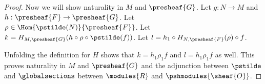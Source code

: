 \begin{proof}
Now we will show naturality in $M$ and $\presheaf{G}$.
Let $g:N\rightarrow M$ and $h:\presheaf{F} \rightarrow \presheaf{G}$.
Let $\rho \in \Hom{\pstilde(N)}{\presheaf{F}}$.
Let $k = H_{M,\presheaf{G}} (h \circ \rho \circ \pstilde(f))$.
Let $l = h_1 \circ H_{N,\presheaf{F}}(\rho) \circ f$.

Unfolding the definition for $H$ shows that $k = h_1\rho_1 f$
and $l = h_1\rho_1 f$ as well.
This proves naturality in $M$ and $\presheaf{G}$ 
and the adjunction between $\pstilde$ and $\globalsections$
between $\modules{R}$ and $\pshmodules{\sheaf{O}}$.
\end{proof}
